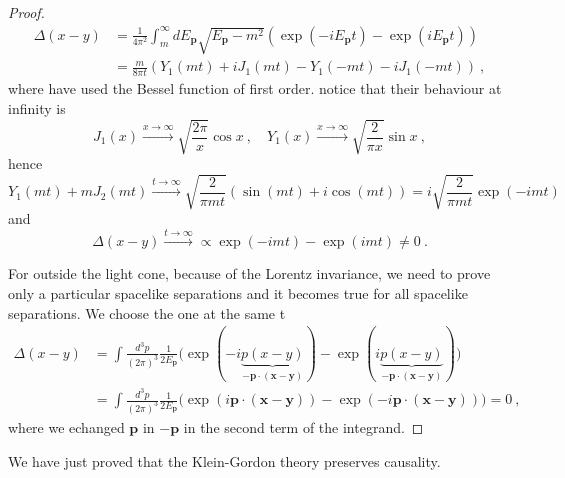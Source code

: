 \begin{proof}
\begin{equation*}
\begin{aligned}
            \Delta (x-y) & = \frac{1}{4\pi^2} \int_m^\infty d E_{\mathbf p} \sqrt{E_{\mathbf p} - m^2} (\exp(- i E_{\mathbf p} t) - \exp(i E_{\mathbf p} t)) \\ & = \frac{m}{8 \pi t} (Y_1(mt) + i J_1(mt) - Y_1(-mt) - i J_1(-mt)) ~,
        \end{aligned}
        \end{equation*}
        where have used the Bessel function of first order. notice that their behaviour at infinity is 
        \begin{equation*}
            J_1(x) \xrightarrow{x \rightarrow \infty} \sqrt{\frac{2\pi}{x}} \cos x ~, \quad Y_1(x) \xrightarrow{x \rightarrow \infty} \sqrt{\frac{2}{\pi x}} \sin x ~,
        \end{equation*}
        hence 
        \begin{equation*}
            Y_1(mt) + m J_2(mt) \xrightarrow{t \rightarrow \infty} \sqrt{\frac{2}{\pi mt}} (\sin (mt) + i \cos (mt)) = i \sqrt{\frac{2}{\pi mt}} \exp(- i mt)
        \end{equation*}
        and 
        \begin{equation*}
            \Delta (x-y) \xrightarrow{t \rightarrow \infty} \propto \exp(-imt) - \exp(i mt) \neq 0~.
        \end{equation*}

        For outside the light cone, because of the Lorentz invariance, we need to prove only a particular spacelike separations and it becomes true for all spacelike separations. We choose the one at the same t
        \begin{equation*}
        \begin{aligned}
            \Delta (x - y) & = \int \frac{d^3 p}{(2 \pi)^3} \frac{1}{2 E_{\mathbf p}} \Big ( \exp(- i \underbrace{p (x - y)}_{- \mathbf p \cdot (\mathbf x - \mathbf y)}) - \exp(i \underbrace{p (x - y)}_{- \mathbf p \cdot (\mathbf x - \mathbf y)}) \Big) \\ & = \int \frac{d^3 p}{(2 \pi)^3} \frac{1}{2 E_{\mathbf p}} \Big ( \exp( i\mathbf p \cdot (\mathbf x - \mathbf y)) - \exp( - i \mathbf p \cdot (\mathbf x - \mathbf y)) \Big) = 0 ~,
        \end{aligned}
        \end{equation*}
        where we echanged $\mathbf p$ in $-\mathbf p$ in the second term of the integrand.
    \end{proof}

    We have just proved that the Klein-Gordon theory preserves causality.
    
